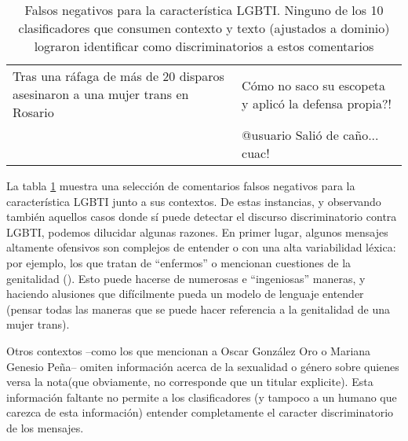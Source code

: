 \begin{table}[t]
\begin{tabularx}{\textwidth}{X X}
        Tras una ráfaga de más de 20 disparos asesinaron a una mujer trans en Rosario & Cómo no saco su escopeta y aplicó la defensa propia?! \\
        & @usuario Salió de caño... cuac!	\\
    \end{tabularx}
    \caption{Falsos negativos para la característica LGBTI. Ninguno de los 10 clasificadores que consumen contexto y texto (ajustados a dominio) lograron identificar como discriminatorios a estos comentarios }
    \label{tab:lgbti_error_analysis}
\end{table}

La tabla \ref{tab:lgbti_error_analysis} muestra una selección de comentarios falsos negativos para la característica LGBTI junto a sus contextos. De estas instancias, y observando también aquellos casos donde sí puede detectar el discurso discriminatorio contra LGBTI, podemos dilucidar algunas razones. En primer lugar, algunos mensajes altamente ofensivos son complejos de entender o con una alta variabilidad léxica: por ejemplo, los que tratan de ``enfermos'' o mencionan cuestiones de la genitalidad (). Esto puede hacerse de numerosas e ``ingeniosas'' maneras, y haciendo alusiones que difícilmente pueda un modelo de lenguaje entender (pensar todas las maneras que se puede hacer referencia a la genitalidad de una mujer trans).

Otros contextos --como los que mencionan a Oscar González Oro o Mariana Genesio Peña-- omiten información acerca de la sexualidad o género sobre quienes versa la nota(que obviamente, no corresponde que un titular explicite). Esta información faltante no permite a los clasificadores (y tampoco a un humano que carezca de esta información) entender completamente el caracter discriminatorio de los mensajes.


